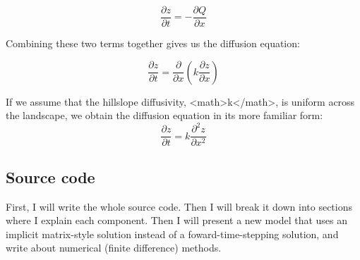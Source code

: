 \documentclass[a4paper,10pt]{scrartcl}
\begin{document}
\begin{equation}
\frac{\partial z}{\partial t} = - \frac{\partial Q}{\partial x}
\end{equation}

Combining these two terms together gives us the diffusion equation:

\begin{equation}
\frac{\partial z}{\partial t} = \frac{\partial}{\partial x} \left(k \frac{\partial z}{\partial x}\right)
\end{equation}

If we assume that the hillslope diffusivity, <math>k</math>, is uniform across the landscape, we obtain the diffusion equation in its more familiar form:
\begin{equation}
\frac{\partial z}{\partial t} = k \frac{\partial^2 z}{\partial x^2}
\end{equation}

\subsection{Source code}

First, I will write the whole source code. Then I will break it down into sections where I explain each component. Then I will present a new model that uses an implicit matrix-style solution instead of a foward-time-stepping solution, and write about numerical (finite difference) methods.
\end{document}
